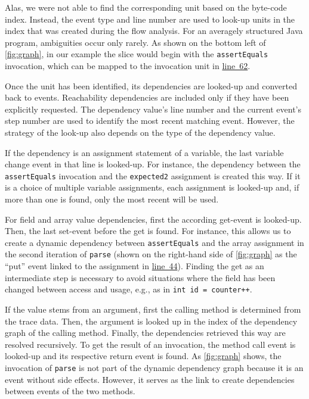 \documentclass[english]{scrartcl}
\newcommand{\linerefn}[2]{\hyperref[#1]{line~#2}}
\begin{document}
Alas, we were not able to find the corresponding unit based on the byte-code index.
Instead, the event type and line number are used to look-up units in the index that was created during the flow analysis.
For an averagely structured Java program, ambiguities occur only rarely.
As shown on the bottom left of \autoref{fig:graph}, in our example the slice would begin with the \verb+assertEquals+ invocation, which can be mapped to the invocation unit in \linerefn{lst:test}{62}.

Once the unit has been identified, its dependencies are looked-up and converted back to events.
Reachability dependencies are included only if they have been explicitly requested.
The dependency value's line number and the current event's step number are used to identify the most recent matching event.
However, the strategy of the look-up also depends on the type of the dependency value.

If the dependency is an assignment statement of a variable, the last variable change event in that line is looked-up.
For instance, the dependency between the \verb+assertEquals+ invocation and the \verb+expected2+ assignment is created this way.
If it is a choice of multiple variable assignments, each assignment is looked-up and, if more than one is found, only the most recent will be used.

For field and array value dependencies, first the according get-event is looked-up.
Then, the last set-event before the get is found.
For instance, this allows us to create a dynamic dependency between \verb+assertEquals+ and the array assignment in the second iteration of \verb+parse+ (shown on the right-hand side of \autoref{fig:graph} as the ``put'' event linked to the assignment in \linerefn{lst:parse}{44}).
Finding the get as an intermediate step is necessary to avoid situations where the field has been changed between access and usage, e.g., as in \verb/int id = counter++/.

If the value stems from an argument, first the calling method is determined from the trace data. 
Then, the argument is looked up in the index of the dependency graph of the calling method.
Finally, the dependencies retrieved this way are resolved recursively.
To get the result of an invocation, the method call event is looked-up and its respective return event is found.
As \autoref{fig:graph} shows, the invocation of \verb+parse+ is not part of the dynamic dependency graph because it is an event without side effects.
However, it serves as the link to create dependencies between events of the two methods.
\end{document}
